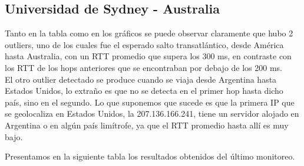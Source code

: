 \subsection{Universidad de Sydney - Australia}

Tanto en la tabla como en los gráficos se puede observar claramente que hubo 2 outliers, uno de los cuales fue el esperado salto transatlántico, desde América hasta Australia, con un RTT promedio que supera los 300 ms, en contraste con los RTT de los hops anteriores que se encontraban por debajo de los 200 ms.
\\
El otro outlier detectado se produce cuando se viaja desde Argentina hasta Estados Unidos, lo extraño es que no se detecta en el primer hop hasta dicho país, sino en el segundo. Lo que suponemos que sucede es que la primera IP que se geolocaliza en Estados Unidos, la 207.136.166.241, tiene un servidor alojado en Argentina o en algún país limítrofe, ya que el RTT promedio hasta allí es muy bajo. 


\bigskip

Presentamos en la siguiente tabla los resultados obtenidos del último monitoreo.

